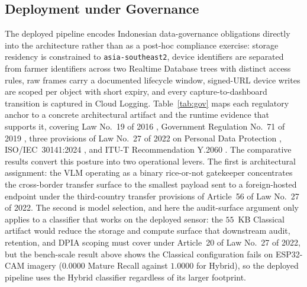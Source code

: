 \documentclass[conference]{IEEEtran}
\begin{document}
\subsection{Deployment under Governance}\label{sec:discuss-gov}
The deployed pipeline encodes Indonesian data-governance obligations directly into the architecture rather than as a post-hoc compliance exercise: storage residency is constrained to \texttt{asia-southeast2}, device identifiers are separated from farmer identifiers across two Realtime Database trees with distinct access rules, raw frames carry a documented lifecycle window, signed-URL device writes are scoped per object with short expiry, and every capture-to-dashboard transition is captured in Cloud Logging. Table~\ref{tab:gov} maps each regulatory anchor to a concrete architectural artifact and the runtime evidence that supports it, covering Law No.~19 of 2016 \cite{b_uuite}, Government Regulation No.~71 of 2019 \cite{b_pp71}, three provisions of Law No.~27 of 2022 on Personal Data Protection \cite{b_pdp}, ISO/IEC~30141:2024 \cite{b_iso30141}, and ITU-T Recommendation Y.2060 \cite{b_y2060}. The comparative results convert this posture into two operational levers. The first is architectural assignment: the VLM operating as a binary rice-or-not gatekeeper concentrates the cross-border transfer surface to the smallest payload sent to a foreign-hosted endpoint under the third-country transfer provisions of Article~56 of Law No.~27 of 2022. The second is model selection, and here the audit-surface argument only applies to a classifier that works on the deployed sensor: the $55$~KB Classical artifact would reduce the storage and compute surface that downstream audit, retention, and DPIA scoping must cover under Article~20 of Law No.~27 of 2022, but the bench-scale result above shows the Classical configuration fails on ESP32-CAM imagery ($0.0000$ Mature Recall against $1.0000$ for Hybrid), so the deployed pipeline uses the Hybrid classifier regardless of its larger footprint.
\end{document}
